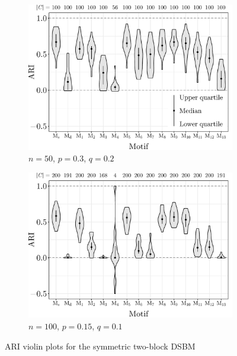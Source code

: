 \begin{figure}[H]
	\begin{subfigure}{.49\textwidth}
		\centering
		\includegraphics[scale=0.4,draft=false]{../../results/motifsym/motifsym_1.pdf}
		\caption{$n=50$, $p=0.3$, $q=0.2$}
	\end{subfigure}
	\begin{subfigure}{.49\textwidth}
		\centering
		\includegraphics[scale=0.4,draft=false]{../../results/motifsym/motifsym_2.pdf}
		\caption{$n=100$, $p=0.15$, $q=0.1$}
	\end{subfigure}
	\caption{ARI violin plots for the symmetric two-block DSBM}
	\label{fig:motifsym}
\end{figure}






